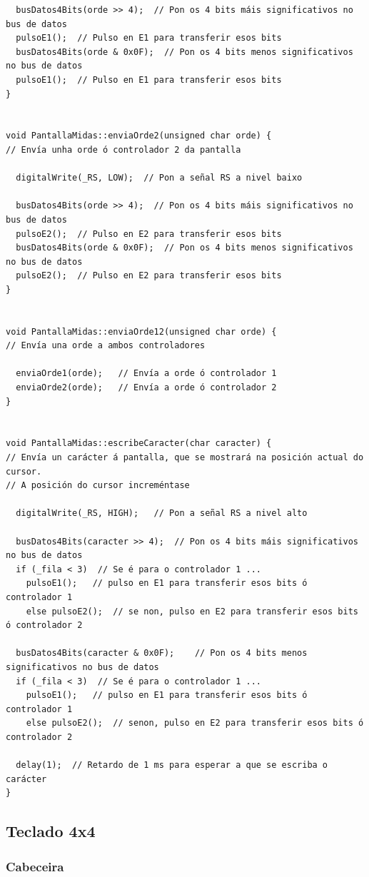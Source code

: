 \documentclass[11pt,twoside]{book}
\begin{document}
\begin{lstlisting}
  busDatos4Bits(orde >> 4);  // Pon os 4 bits máis significativos no bus de datos
  pulsoE1();  // Pulso en E1 para transferir esos bits
  busDatos4Bits(orde & 0x0F);  // Pon os 4 bits menos significativos no bus de datos
  pulsoE1();  // Pulso en E1 para transferir esos bits
}


void PantallaMidas::enviaOrde2(unsigned char orde) {
// Envía unha orde ó controlador 2 da pantalla

  digitalWrite(_RS, LOW);  // Pon a señal RS a nivel baixo
  
  busDatos4Bits(orde >> 4);  // Pon os 4 bits máis significativos no bus de datos
  pulsoE2();  // Pulso en E2 para transferir esos bits
  busDatos4Bits(orde & 0x0F);  // Pon os 4 bits menos significativos no bus de datos
  pulsoE2();  // Pulso en E2 para transferir esos bits
}


void PantallaMidas::enviaOrde12(unsigned char orde) {
// Envía una orde a ambos controladores

  enviaOrde1(orde);   // Envía a orde ó controlador 1
  enviaOrde2(orde);   // Envía a orde ó controlador 2
}


void PantallaMidas::escribeCaracter(char caracter) {
// Envía un carácter á pantalla, que se mostrará na posición actual do cursor. 
// A posición do cursor increméntase

  digitalWrite(_RS, HIGH);   // Pon a señal RS a nivel alto
  
  busDatos4Bits(caracter >> 4);  // Pon os 4 bits máis significativos no bus de datos
  if (_fila < 3)  // Se é para o controlador 1 ...
    pulsoE1();   // pulso en E1 para transferir esos bits ó controlador 1
    else pulsoE2();  // se non, pulso en E2 para transferir esos bits ó controlador 2
    
  busDatos4Bits(caracter & 0x0F);    // Pon os 4 bits menos significativos no bus de datos
  if (_fila < 3)  // Se é para o controlador 1 ...
    pulsoE1();   // pulso en E1 para transferir esos bits ó controlador 1
    else pulsoE2();  // senon, pulso en E2 para transferir esos bits ó controlador 2
    
  delay(1);  // Retardo de 1 ms para esperar a que se escriba o carácter
}
\end{lstlisting}

\subsection{Teclado 4x4}

\subsubsection{Cabeceira}
\end{document}
